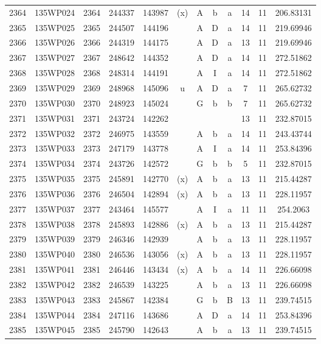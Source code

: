 \begin{tabular}{|*{12}{c|}}
2364 & 135WP024 & 2364 & 244337 & 143987 & (x) & A & b & a & 14 & 11 & 206.83131 \\ 
2365 & 135WP025 & 2365 & 244507 & 144196 &  & A & D & a & 14 & 11 & 219.69946 \\ 
2366 & 135WP026 & 2366 & 244319 & 144175 &  & A & D & a & 13 & 11 & 219.69946 \\ 
2367 & 135WP027 & 2367 & 248642 & 144352 &  & A & D & a & 14 & 11 & 272.51862 \\ 
2368 & 135WP028 & 2368 & 248314 & 144191 &  & A & I & a & 14 & 11 & 272.51862 \\ 
2369 & 135WP029 & 2369 & 248968 & 145096 & u & A & D & a & 7 & 11 & 265.62732 \\ 
2370 & 135WP030 & 2370 & 248923 & 145024 &  & G & b & b & 7 & 11 & 265.62732 \\ 
2371 & 135WP031 & 2371 & 243724 & 142262 &  &  &  &  & 13 & 11 & 232.87015 \\ 
2372 & 135WP032 & 2372 & 246975 & 143559 &  & A & b & a & 14 & 11 & 243.43744 \\ 
2373 & 135WP033 & 2373 & 247179 & 143778 &  & A & I & a & 14 & 11 & 253.84396 \\ 
2374 & 135WP034 & 2374 & 243726 & 142572 &  & G & b & b & 5 & 11 & 232.87015 \\ 
2375 & 135WP035 & 2375 & 245891 & 142770 & (x) & A & b & a & 13 & 11 & 215.44287 \\ 
2376 & 135WP036 & 2376 & 246504 & 142894 & (x) & A & b & a & 13 & 11 & 228.11957 \\ 
2377 & 135WP037 & 2377 & 243464 & 145577 &  & A & I & a & 11 & 11 & 254.2063 \\ 
2378 & 135WP038 & 2378 & 245893 & 142886 & (x) & A & b & a & 13 & 11 & 215.44287 \\ 
2379 & 135WP039 & 2379 & 246346 & 142939 &  & A & b & a & 13 & 11 & 228.11957 \\ 
2380 & 135WP040 & 2380 & 246536 & 143056 & (x) & A & b & a & 13 & 11 & 228.11957 \\ 
2381 & 135WP041 & 2381 & 246446 & 143434 & (x) & A & b & a & 14 & 11 & 226.66098 \\ 
2382 & 135WP042 & 2382 & 246539 & 143225 &  & A & b & a & 13 & 11 & 226.66098 \\ 
2383 & 135WP043 & 2383 & 245867 & 142384 &  & G & b & B & 13 & 11 & 239.74515 \\ 
2384 & 135WP044 & 2384 & 247116 & 143686 &  & A & D & a & 14 & 11 & 253.84396 \\ 
2385 & 135WP045 & 2385 & 245790 & 142643 &  & A & b & a & 13 & 11 & 239.74515 \\ 

\end{tabular}
